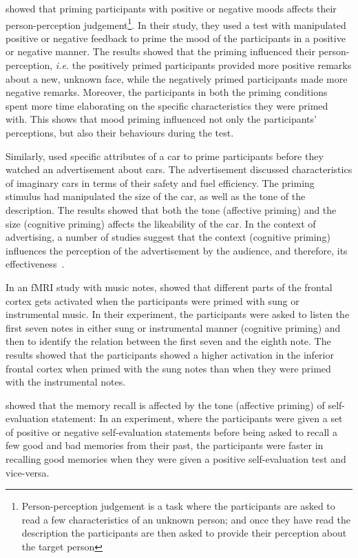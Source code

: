 \documentclass[lettersize, noapacite, twoside, HRI]{apa_HRI}
\newcommand{\ie}{\textit{i.e.}\xspace}
\begin{document}
\cite{forgas1987mood} showed that priming participants with positive or negative
moods affects their person-perception judgement\footnote{Person-perception
judgement is a task where the participants are asked to read a few
characteristics of an unknown person; and once they have read the description
the participants are then asked to provide their perception about the target
person}. In their study, they used a test with manipulated positive or negative
feedback to prime the mood of the participants in a positive or negative manner.
The results showed that the priming influenced their person-perception, \ie the
positively primed participants provided more positive remarks about a new,
unknown face, while the negatively primed participants made more negative
remarks. Moreover, the participants in both the priming conditions spent more
time elaborating on the specific characteristics they were primed with. This
shows that mood priming influenced not only the participants' perceptions, but
also their behaviours during the test.

Similarly, \cite{yi1990cognitive} used specific attributes of a car to prime
participants before they watched an advertisement about cars. The advertisement
discussed characteristics of imaginary cars in terms of their safety and fuel
efficiency.  The priming stimulus had manipulated the size of the car, as well
as the tone of the description. The results showed that both the tone (affective
priming) and the size (cognitive priming) affects the likeability of the car.
In the context of advertising, a number of studies suggest that the context
(cognitive priming) influences the perception of the advertisement by the
audience, and therefore, its effectiveness~\citep{singh1987arousal,soldow1981response}.

In an fMRI study with music notes, \cite{tillmann2006cognitive} showed that
different parts of the frontal cortex gets activated when the participants were
primed with sung or instrumental music. In their experiment, the participants were
asked to listen the first seven notes in either sung or instrumental manner
(cognitive priming) and then to identify the relation between the first seven
and the eighth note. The results showed that the participants showed a higher
activation in the inferior frontal cortex when primed with the sung notes than
when they were primed with the instrumental notes.

\cite{rholes1987emotional} showed that the memory recall is affected by the tone
(affective priming) of self-evaluation statement: In an experiment, where
the participants were given a set of positive or negative self-evaluation
statements before being asked to recall a few good and bad memories from their
past, the participants were faster in recalling good memories when they were
given a positive self-evaluation test and vice-versa.
\end{document}
